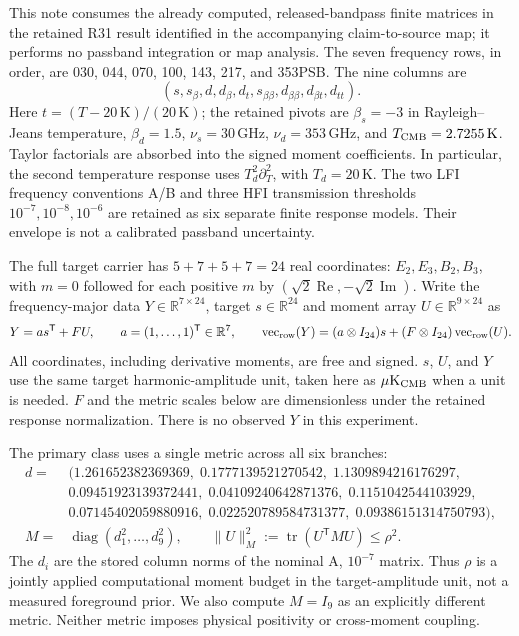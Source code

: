 \documentclass[aps,prd,onecolumn,11pt,nofootinbib,notitlepage]{revtex4-2}
\begin{document}
This note consumes the already computed, released-bandpass finite matrices in the retained R31 result identified in the accompanying claim-to-source map; it performs no passband integration or map analysis. The seven frequency rows, in order, are 030, 044, 070, 100, 143, 217, and 353PSB. The nine columns are
\begin{equation}
 (s,s_\beta,d,d_\beta,d_t,s_{\beta\beta},d_{\beta\beta},d_{\beta t},d_{tt}).
 \label{eq:order}
\end{equation}
Here $t=(T-20\,\mathrm K)/(20\,\mathrm K)$; the retained pivots are $\beta_s=-3$ in Rayleigh--Jeans temperature, $\beta_d=1.5$, $\nu_s=30\,\mathrm{GHz}$, $\nu_d=353\,\mathrm{GHz}$, and $T_{\rm CMB}=2.7255\,\mathrm K$. Taylor factorials are absorbed into the signed moment coefficients. In particular, the second temperature response uses $T_d^2\partial_T^2$, with $T_d=20\,\mathrm K$. The two LFI frequency conventions A/B and three HFI transmission thresholds $10^{-7},10^{-8},10^{-6}$ are retained as six separate finite response models. Their envelope is not a calibrated passband uncertainty.

The full target carrier has $5+7+5+7=24$ real coordinates: $E_2,E_3,B_2,B_3$, with $m=0$ followed for each positive $m$ by $(\sqrt2\operatorname{Re},-\sqrt2\operatorname{Im})$. Write the frequency-major data $Y\in\mathbb R^{7\times24}$, target $s\in\mathbb R^{24}$ and moment array $U\in\mathbb R^{9\times24}$ as
\begin{equation}
 Y=a s^{\mathsf T}+FU,\qquad a=(1,\ldots,1)^{\mathsf T}\in\mathbb R^7,
 \qquad \operatorname{vec}_{\rm row}(Y)=(a\otimes I_{24})s+(F\otimes I_{24})\operatorname{vec}_{\rm row}(U).
 \label{eq:model}
\end{equation}
All coordinates, including derivative moments, are free and signed. $s$, $U$, and $Y$ use the same target harmonic-amplitude unit, taken here as $\mu\mathrm K_{\rm CMB}$ when a unit is needed. $F$ and the metric scales below are dimensionless under the retained response normalization. There is no observed $Y$ in this experiment.

The primary class uses a single metric across all six branches:
\begin{align}
 d={}&(1.261652382369369,\;0.1777139521270542,\;1.1309894216176297,\nonumber\\
 &0.09451923139372441,\;0.04109240642871376,\;0.1151042544103929,\nonumber\\
 &0.07145402059880916,\;0.022520789584731377,\;0.09386151314750793),\nonumber\\
 M={}&\operatorname{diag}(d_1^2,\ldots,d_9^2),\qquad
 \|U\|_M^2:=\operatorname{tr}(U^{\mathsf T}MU)\le\rho^2.
 \label{eq:metric}
\end{align}
The $d_i$ are the stored column norms of the nominal A, $10^{-7}$ matrix. Thus $\rho$ is a jointly applied computational moment budget in the target-amplitude unit, not a measured foreground prior. We also compute $M=I_9$ as an explicitly different metric. Neither metric imposes physical positivity or cross-moment coupling.
\end{document}

